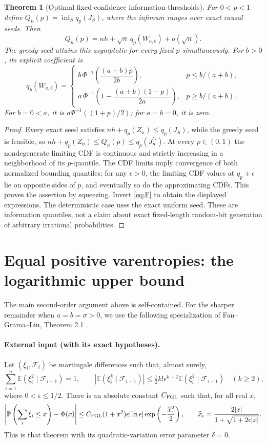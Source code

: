 \documentclass[11pt,a4paper]{article}
\newtheorem{theorem}{Theorem}
\newcommand{\E}{\mathbb E}
\newcommand{\Prob}{\mathbb P}
\begin{document}
\begin{theorem}[Optimal fixed-confidence information thresholds]\label{thm:thresholds}
For $0<p<1$ define
$Q_n(p)=\inf_S q_p(J_S)$, where the infimum ranges over exact causal
seeds. Then
\[
Q_n(p)=nh+\sqrt n\,q_p(W_{a,b})+o(\sqrt n).
\]
The greedy seed attains this asymptotic for every fixed $p$ simultaneously.
For $b>0$, its explicit coefficient is
\[
q_p(W_{a,b})=
\begin{cases}
b\,\Phi^{-1}\!\left(\dfrac{(a+b)p}{2b}\right),
 &p\le b/(a+b),\\[5pt]
a\,\Phi^{-1}\!\left(1-\dfrac{(a+b)(1-p)}{2a}\right),
 &p\ge b/(a+b).
\end{cases}
\]
For $b=0<a$, it is $a\Phi^{-1}((1+p)/2)$; for $a=b=0$, it is zero.
\end{theorem}
\begin{proof}
Every exact seed satisfies $nh+q_p(Z_n)\le q_p(J_S)$, while the greedy
seed is feasible, so
$nh+q_p(Z_n)\le Q_n(p)\le q_p(J_n^G)$.
At every $p\in(0,1)$ the nondegenerate limiting CDF is continuous and
strictly increasing in a neighborhood of its $p$-quantile. The CDF
limits imply convergence of both normalized bounding quantiles: for
any $\epsilon>0$, the limiting CDF values at $q_p\pm\epsilon$ lie on
opposite sides of $p$, and eventually so do the approximating CDFs.
This proves the assertion by squeezing. Invert \eqref{eq:F} to obtain
the displayed expressions. The deterministic case uses the exact
uniform seed. These are information quantiles, not a claim about exact
fixed-length random-bit generation of arbitrary irrational probabilities.
\end{proof}

\section{Equal positive varentropies: the logarithmic upper bound}\label{sec:fgl}
The main second-order argument above is self-contained. For the sharper
remainder when $a=b=\sigma>0$, we use the following specialization of
Fan--Grama--Liu, Theorem 2.1 \cite{FGL}.

\paragraph{External input (with its exact hypotheses).}
Let $(\xi_i,\mathcal F_i)$ be martingale differences such that, almost
surely,
\[
\sum_{i=1}^n\E(\xi_i^2\mid\mathcal F_{i-1})=1,\qquad
\left|\E(\xi_i^k\mid\mathcal F_{i-1})\right|
\le\tfrac12 k!\epsilon^{k-2}\E(\xi_i^2\mid\mathcal F_{i-1})
\quad(k\ge2),
\]
where $0<\epsilon\le1/2$. There is an absolute constant $C_{\rm FGL}$
such that, for all real $x$,
\begin{equation}\label{eq:fgl}
\left|\Prob\left(\sum_i\xi_i\le x\right)-\Phi(x)\right|
\le C_{\rm FGL}(1+x^2)\epsilon|\ln\epsilon|
\exp\left(-\frac{\widehat x_\epsilon^2}{2}\right),\qquad
\widehat x_\epsilon=\frac{2|x|}{1+\sqrt{1+2\epsilon|x|}}.
\end{equation}
This is that theorem with its quadratic-variation error parameter
$\delta=0$.
\end{document}

